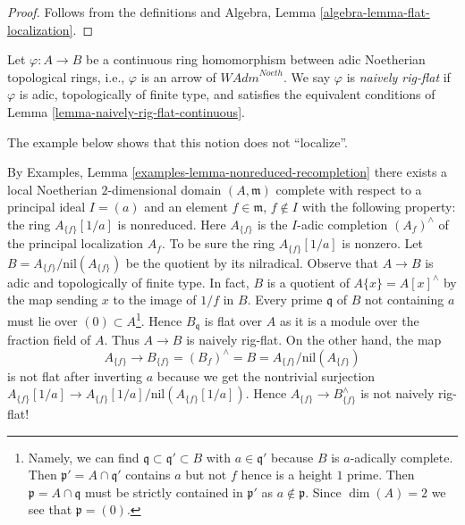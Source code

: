 \begin{proof}
Follows from the definitions and
Algebra, Lemma \ref{algebra-lemma-flat-localization}.
\end{proof}

\begin{definition}
\label{definition-naively-rig-flat}
Let $\varphi : A \to B$ be a continuous ring homomorphism
between adic Noetherian topological rings, i.e., $\varphi$
is an arrow of $\textit{WAdm}^{Noeth}$. We say $\varphi$ is
{\it naively rig-flat} if $\varphi$ is adic, topologically
of finite type, and satisfies the equivalent conditions of
Lemma \ref{lemma-naively-rig-flat-continuous}.
\end{definition}

\noindent
The example below shows that this notion does not ``localize''.

\begin{example}
\label{example-recompletion-not-rig-flat}
By Examples, Lemma \ref{examples-lemma-nonreduced-recompletion}
there exists a local Noetherian $2$-dimensional domain $(A, \mathfrak m)$
complete with respect to a principal ideal $I = (a)$ and an
element $f \in \mathfrak m$, $f \not \in I$ with the following
property: the ring $A_{\{f\}}[1/a]$ is nonreduced.
Here $A_{\{f\}}$ is the $I$-adic completion $(A_f)^\wedge$ of the principal
localization $A_f$. To be sure the ring $A_{\{f\}}[1/a]$ is nonzero.
Let $B = A_{\{f\}}/ \text{nil}(A_{\{f\}})$ be the quotient
by its nilradical. Observe that $A \to B$ is adic and
topologically of finite type.
In fact, $B$ is a quotient of $A\{x\} = A[x]^\wedge$ by the
map sending $x$ to the image of $1/f$ in $B$.
Every prime $\mathfrak q$ of $B$ not containing $a$ must
lie over $(0) \subset A$\footnote{Namely, we can find
$\mathfrak q \subset \mathfrak q' \subset B$ with $a \in \mathfrak q'$
because $B$ is $a$-adically complete. Then $\mathfrak p' = A \cap \mathfrak q'$
contains $a$ but not $f$ hence is a height $1$ prime. Then
$\mathfrak p = A \cap \mathfrak q$ must be strictly
contained in $\mathfrak p'$ as $a \not \in \mathfrak p$. Since
$\dim(A) = 2$ we see that $\mathfrak p = (0)$.}. Hence $B_\mathfrak q$
is flat over $A$ as it is a module over the
fraction field of $A$. Thus $A \to B$ is naively rig-flat.
On the other hand, the map
$$
A_{\{f\}}
\longrightarrow
B_{\{f\}} = (B_f)^\wedge = B = A_{\{f\}} /\text{nil}(A_{\{f\}})
$$
is not flat after inverting $a$ because we get the nontrivial surjection
$A_{\{f\}}[1/a] \to A_{\{f\}}[1/a]/\text{nil}(A_{\{f\}}[1/a])$.
Hence $A_{\{f\}} \to B_{\{f\}}^\wedge$ is not naively rig-flat!
\end{example}

